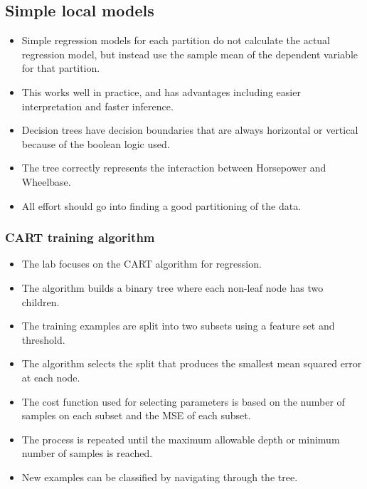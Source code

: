 \documentclass[11pt]{article}
\providecommand{\tightlist}{%
      \setlength{\itemsep}{0pt}\setlength{\parskip}{0pt}}
\begin{document}
\hypertarget{simple-local-models}{%
\subsection{Simple local models}\label{simple-local-models}}

\begin{itemize}
\tightlist
\item
  Simple regression models for each partition do not calculate the
  actual regression model, but instead use the sample mean of the
  dependent variable for that partition.
\item
  This works well in practice, and has advantages including easier
  interpretation and faster inference.
\item
  Decision trees have decision boundaries that are always horizontal or
  vertical because of the boolean logic used.
\item
  The tree correctly represents the interaction between Horsepower and
  Wheelbase.
\item
  All effort should go into finding a good partitioning of the data.
\end{itemize}

\hypertarget{cart-training-algorithm}{%
\subsubsection{CART training algorithm}\label{cart-training-algorithm}}

\begin{itemize}
\tightlist
\item
  The lab focuses on the CART algorithm for regression.
\item
  The algorithm builds a binary tree where each non-leaf node has two
  children.
\item
  The training examples are split into two subsets using a feature set
  and threshold.
\item
  The algorithm selects the split that produces the smallest mean
  squared error at each node.
\item
  The cost function used for selecting parameters is based on the number
  of samples on each subset and the MSE of each subset.
\item
  The process is repeated until the maximum allowable depth or minimum
  number of samples is reached.
\item
  New examples can be classified by navigating through the tree.
\end{itemize}
\end{document}
